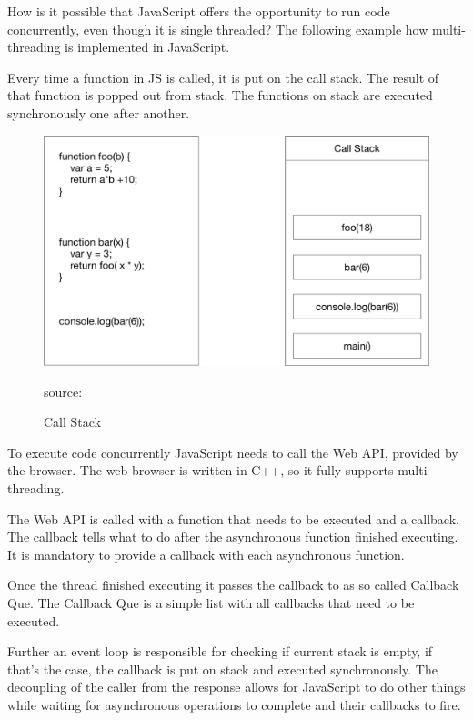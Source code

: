 How is it possible that JavaScript offers the opportunity to run code concurrently, even though it is single threaded? The following example how multi-threading is implemented in JavaScript.

Every time a function in \gls{JS} is called, it is put on the call stack. The result of that function is popped out from stack. The functions on stack are executed synchronously one after another.

\begin{figure}[H]
	\centering
	\includegraphics[width=0.8\linewidth]{bilder/grundlagen/CallStack.png}
	\caption{Call Stack} source:\cite{CallStack}
	\label{fig:CS}
\end{figure}

To execute code concurrently JavaScript needs to call the Web API, provided by the browser. The web browser is written in C++, so it fully supports multi-threading.

The Web API is called with a function that needs to be executed and a callback.
The callback tells what to do after the asynchronous function finished executing. It is mandatory to provide a callback with each asynchronous function.

Once the thread finished executing it passes the callback to as so called Callback Que. The Callback Que is a simple list with all callbacks that need to be executed. 

Further an event loop is responsible for checking if current stack is empty, if that's the case, the callback is put on stack and executed synchronously. The decoupling of the caller from the response allows for JavaScript to do other things while waiting for asynchronous operations to complete and their callbacks to fire. 

